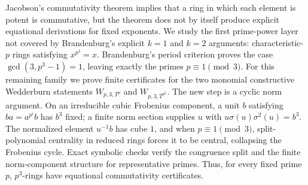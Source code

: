 Jacobson's commutativity theorem implies that a ring in which each element is potent is commutative, but the theorem does not by itself produce explicit equational derivations for fixed exponents. We study the first prime-power layer not covered by Brandenburg's explicit \(k=1\) and \(k=2\) arguments: characteristic-\(p\) rings satisfying \(x^{p^3}=x\). Brandenburg's period criterion proves the case \(\gcd(3,p^3-1)=1\), leaving exactly the primes \(p\equiv 1 \pmod 3\). For this remaining family we prove finite certificates for the two monomial constructive Wedderburn statements \(W_{p,3,T^p}\) and \(W_{p,3,T^{p^2}}\). The new step is a cyclic norm argument. On an irreducible cubic Frobenius component, a unit \(b\) satisfying \(ba=a^{p^i}b\) has \(b^3\) fixed; a finite norm section supplies \(u\) with \(u\sigma(u)\sigma^2(u)=b^3\). The normalized element \(u^{-1}b\) has cube \(1\), and when \(p\equiv 1 \pmod 3\), split-polynomial centrality in reduced rings forces it to be central, collapsing the Frobenius cycle. Exact symbolic checks verify the congruence split and the finite norm-component structure for representative primes. Thus, for every fixed prime \(p\), \(p^3\)-rings have equational commutativity certificates.
